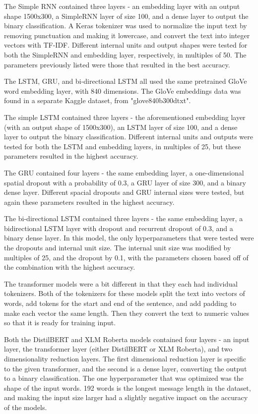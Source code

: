 \documentclass{article}
\begin{document}
The Simple RNN contained three layers - an embedding layer with an output shape 1500x300, a SimpleRNN layer of size 100, and a dense layer to output the binary classification. A Keras tokenizer was used to normalize the input text by removing punctuation and making it lowercase, and convert the text into integer vectors with TF-IDF. Different internal units and output shapes were tested for both the SimpleRNN and embedding layer, respectively, in multiples of 50. The parameters previously listed were those that resulted in the best accuracy.

The LSTM, GRU, and bi-directional LSTM all used the same pretrained GloVe word embedding layer, with 840 dimensions. The GloVe embeddings data was found in a separate Kaggle dataset, from "glove840b300dtxt".

The simple LSTM contained three layers - the aforementioned embedding layer (with an output shape of 1500x300), an LSTM layer of size 100, and a dense layer to output the binary classification. Different internal units and outputs were tested for both the LSTM and embedding layers, in multiples of 25, but these parameters resulted in the highest accuracy.

The GRU contained four layers - the same embedding layer, a one-dimensional spatial dropout with a probability of 0.3, a GRU layer of size 300, and a binary dense layer. Different spacial dropouts and GRU internal sizes were tested, but again these parameters resulted in the highest accuracy.

The bi-directional LSTM contained three layers - the same embedding layer, a bidirectional LSTM layer with dropout and recurrent dropout of 0.3, and a binary dense layer. In this model, the only hyperparameters that were tested were the dropouts and internal unit size. The internal unit size was modified by multiples of 25, and the dropout by 0.1, with the parameters chosen based off  of the combination with the highest accuracy.

The transformer models were a bit different in that they each had individual tokenizers. Both of the tokenizers for these models split the text into vectors of words, add tokens for the start and end of the sentence, and add padding to make each vector the same length. Then they convert the text to numeric values so that it is ready for training input.

Both the DistilBERT and XLM Roberta models contained four layers - an input layer, the transformer layer (either DistilBERT or XLM Roberta), and two dimensionality reduction layers. The first dimensional reduction layer is specific to the given transformer, and the second is a dense layer, converting the output to a binary classification. The one hyperparameter that was optimized was the shape of the input words. 192 words is the longest message length in the dataset, and making the input size larger had a slightly negative impact on the accuracy of the models.
\end{document}
